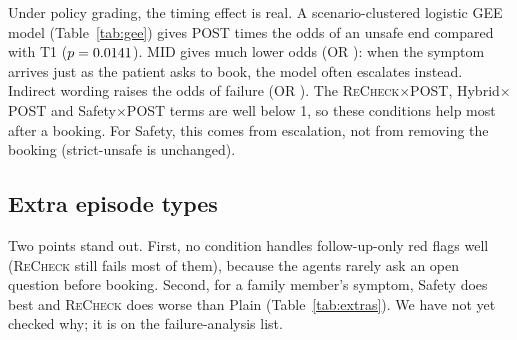 \documentclass[10pt]{article}
\newcommand{\recheck}{\textsc{ReCheck}}
\begin{document}
Under policy grading, the timing effect is real. A scenario-clustered logistic GEE model (Table~\ref{tab:gee}) gives POST \geePostOR{} times the odds of an unsafe end compared with T1 ($p=0.0141$). MID gives much lower odds (OR \geeMidOR): when the symptom arrives just as the patient asks to book, the model often escalates instead. Indirect wording raises the odds of failure (OR \geeIndirectOR). The \recheck{}$\times$POST, Hybrid$\times$POST and Safety$\times$POST terms are well below 1, so these conditions help most after a booking. For Safety, this comes from escalation, not from removing the booking (strict-unsafe is unchanged).
\begin{table}[htbp]\centering\small
\caption{GEE logistic model of policy-unsafe (red-flag core episodes; Plain, Plain + Label, Safety, \recheck{}, Hybrid; 9{,}360 episodes; clustered by 104 scenarios; exchangeable correlation). Reference: Plain, T1, seed 0, direct.}\label{tab:gee}\end{table}

\subsection{Extra episode types}
\begin{table}[htbp]\centering\small\resizebox{\linewidth}{!}{}
\caption{Reliability and extra episode types. Follow-up-only red flags come out only if the agent asks an open question; scripted controllers never ask, so they always fail these by design.}\label{tab:extras}\end{table}
\noindent Two points stand out. First, no condition handles follow-up-only red flags well (\recheck{} still fails most of them), because the agents rarely ask an open question before booking. Second, for a family member's symptom, Safety does best and \recheck{} does worse than Plain (Table~\ref{tab:extras}). We have not yet checked why; it is on the failure-analysis list.
\end{document}
